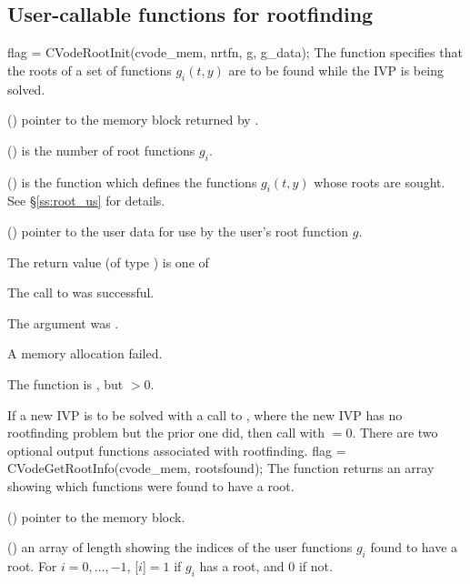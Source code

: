 \subsection{User-callable functions for rootfinding}\label{ss:root_uc}

{
  flag = CVodeRootInit(cvode\_mem, nrtfn, g, g\_data);
}
{
  The function  specifies that the roots of a set of
  functions $g_i(t,y)$ are to be found while the IVP is being solved.
}
{
  \begin{args}
  \item[cvode\_mem] ()
    pointer to the {\cvode} memory block returned by .
  \item[nrtfn] ()
    is the number of root functions $g_i$.
  \item[g] ()
    is the {\C} function which defines the  functions $g_i(t,y)$
    whose roots are sought. See \S\ref{ss:root_us} for details.
  \item[g\_data] ()
    pointer to the user data for use by the user's root function $g$.
 \end{args}
}
{
  The return value  (of type ) is one of
  \begin{args}
  \item[CV\_SUCCESS]
    The call to  was successful.
  \item[CV\_MEM\_NULL]
    The  argument was .
  \item[CV\_MEM\_FAIL]
    A memory allocation failed.
  \item[CV\_RTFUNC\_NULL]
    The function  is , but $>0$.
  \end{args}
}
{
  If a new IVP is to be solved with a call to , where the new
  IVP has no rootfinding problem but the prior one did, then call
   with $=0$.
}
There are two optional output functions associated with rootfinding.
{
  flag = CVodeGetRootInfo(cvode\_mem, rootsfound);
}
{
  The function  returns an array showing which 
  functions were found to have a root.
}
{
  \begin{args}
  \item[cvode\_mem] ()
    pointer to the {\cvodes} memory block.
  \item[rootsfound] ()
    an  array of length  showing the indices
    of the user functions $g_i$ found to have a root.  For
    $i=0,\ldots,$$-1$, [$i$]$=1$ if $g_i$
    has a root, and $0$ if not.
  \end{args}
}

